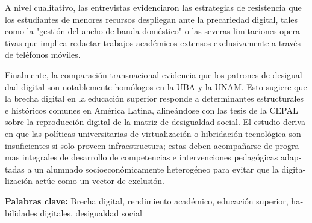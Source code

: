 \begin{tcolorbox}[colback=brown!8!white,colframe=brown!8!white,boxrule=0pt,arc=2pt,left=4pt,right=4pt,top=3pt,bottom=3pt,before skip=4pt,after skip=4pt]
\begin{otherlanguage}{spanish}
A nivel cualitativo, las entrevistas evidenciaron las estrategias de resistencia que los estudiantes de menores recursos despliegan ante la precariedad digital, tales como la "gestión del ancho de banda doméstico" o las severas limitaciones operativas que implica redactar trabajos académicos extensos exclusivamente a través de teléfonos móviles.

Finalmente, la comparación transnacional evidencia que los patrones de desigualdad digital son notablemente homólogos en la UBA y la UNAM. Esto sugiere que la brecha digital en la educación superior responde a determinantes estructurales e históricos comunes en América Latina, alineándose con las tesis de la CEPAL sobre la reproducción digital de la matriz de desigualdad social. El estudio deriva en  que las políticas universitarias de virtualización o hibridación tecnológica son insuficientes si solo proveen infraestructura; estas deben acompañarse de programas integrales de desarrollo de competencias e intervenciones pedagógicas adaptadas a un alumnado socioeconómicamente heterogéneo para evitar que la digitalización actúe como un vector de exclusión.
\par\smallskip\noindent\textbf{Palabras clave:} Brecha digital, rendimiento académico, educación superior, habilidades digitales, desigualdad social
\end{otherlanguage}
\end{tcolorbox}

